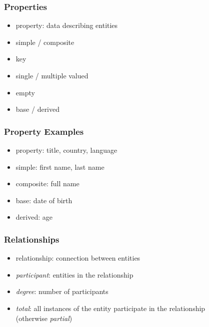 \documentclass[dvipsnames]{beamer}
\begin{document}
\begin{frame}
  \frametitle{Properties}

  \begin{itemize}
    \item \alert{property}: data describing entities

    \medskip
    \item simple / composite
    \item key
    \item single / multiple valued
    \item empty
    \item base / derived
  \end{itemize}
\end{frame}

\begin{frame}
  \frametitle{Property Examples}

  \begin{itemize}
    \item property: title, country, language

    \pause
    \medskip
    \item simple: first name, last name
    \item composite: full name

    \pause
    \medskip
    \item base: date of birth
    \item derived: age
  \end{itemize}
\end{frame}

\begin{frame}
  \frametitle{Relationships}

  \begin{itemize}
    \item \alert{relationship}: connection between entities

    \medskip
    \item \emph{participant}: entities in the relationship
    \item \emph{degree}: number of participants
    \item \emph{total}: all instances of the entity
      participate in the relationship\\
      (otherwise \emph{partial})
  \end{itemize}
\end{frame}
\end{document}
